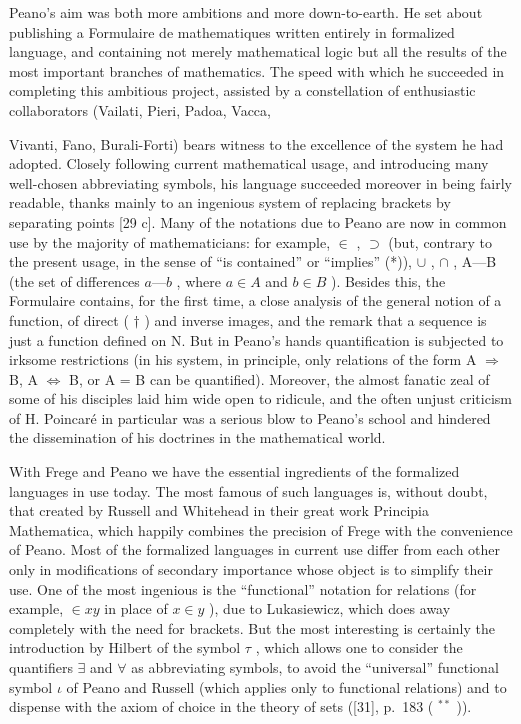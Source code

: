 Peano's aim was both more ambitions and more down-to-earth. He set about publishing a Formulaire de mathematiques written entirely in formalized language, and containing not merely mathematical logic but all the results of the most important branches of mathematics. The speed with which he succeeded in completing this ambitious project, assisted by a constellation of enthusiastic collaborators (Vailati, Pieri, Padoa, Vacca,

Vivanti, Fano, Burali-Forti) bears witness to the excellence of the system he had adopted. Closely following current mathematical usage, and introducing many well-chosen abbreviating symbols, his language succeeded moreover in being fairly readable, thanks mainly to an ingenious system of replacing brackets by separating points {[}29 c{]}. Many of the notations due to Peano are now in common use by the majority of mathematicians: for example, \(\in\) , \(\supset\) (but, contrary to the present usage, in the sense of ``is contained'' or ``implies'' (*)), \(\cup\) , \(\cap\) , A---B (the set of differences \(a—b\) , where \(a\in A\) and \(b\in B\) ). Besides this, the Formulaire contains, for the first time, a close analysis of the general notion of a function, of direct ( \(\dagger\) ) and inverse images, and the remark that a sequence is just a function defined on N. But in Peano's hands quantification is subjected to irksome restrictions (in his system, in principle, only relations of the form A \(\Longrightarrow\) B, A \(\Longleftrightarrow\) B, or A = B can be quantified). Moreover, the almost fanatic zeal of some of his disciples laid him wide open to ridicule, and the often unjust criticism of H. Poincaré in particular was a serious blow to Peano's school and hindered the dissemination of his doctrines in the mathematical world.

With Frege and Peano we have the essential ingredients of the formalized languages in use today. The most famous of such languages is, without doubt, that created by Russell and Whitehead in their great work Principia Mathematica, which happily combines the precision of Frege with the convenience of Peano. Most of the formalized languages in current use differ from each other only in modifications of secondary importance whose object is to simplify their use. One of the most ingenious is the ``functional'' notation for relations (for example, \(\in xy\) in place of \(x \in y\) ), due to Lukasiewicz, which does away completely with the need for brackets. But the most interesting is certainly the introduction by Hilbert of the symbol \(\tau\) , which allows one to consider the quantifiers \(\exists\) and \(\forall\) as abbreviating symbols, to avoid the ``universal'' functional symbol \(\iota\) of Peano and Russell (which applies only to functional relations) and to dispense with the axiom of choice in the theory of sets ({[}31{]}, p.~183 ( \(^{**}\) )).

